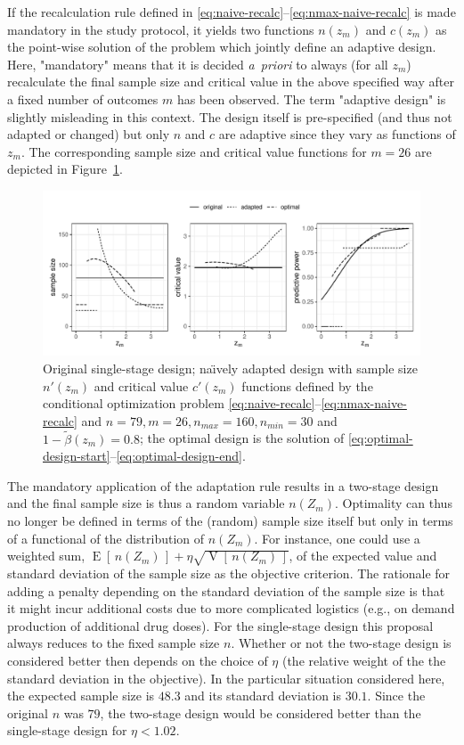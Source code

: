 \documentclass[12pt]{article}
\newcommand{\E}{\ensuremath{\operatorname{E}}}
\newcommand{\V}{\operatorname{V}}
\begin{document}
If the recalculation rule defined in \eqref{eq:naive-recalc}--\eqref{eq:nmax-naive-recalc} is made mandatory in the
study protocol,
it yields two functions $n(z_m)$ and $c(z_m)$ as the point-wise solution of the problem
which jointly define an adaptive design.
Here, "mandatory" means that it is decided \textit{a~priori} to always (for all $z_m$)
recalculate the
final sample size and critical value in the
above specified way after a fixed number of outcomes $m$ has been observed.
The term "adaptive design" is slightly misleading in this context.
The design itself is pre-specified (and thus not adapted or changed)
but only $n$ and $c$ are adaptive since they vary as functions of $z_m$.
The corresponding sample size and critical value functions for $m=26$ are depicted in Figure~\ref{fig:binding-recalculation}.
\begin{figure}
    \centering
    \includegraphics[width=\textwidth]{figures/naive_adaptive_and_optimal_designs}
    \caption{%
        Original single-stage design; na\"{\i}vely adapted design
        with sample size $n'(z_m)$ and critical value $c'(z_m)$ functions defined by the conditional optimization problem \eqref{eq:naive-recalc}--\eqref{eq:nmax-naive-recalc} and
        ${n=79}, {m=26}, {n_{max}=160}, {n_{min}=30}$ and $1-\widetilde{\beta}(z_m)=0.8$;
        the optimal design is the solution of \eqref{eq:optimal-design-start}--\eqref{eq:optimal-design-end}.
    }
    \label{fig:binding-recalculation}
\end{figure}

The mandatory application of the adaptation rule
results in a two-stage design and the final sample size is thus a random variable $n(Z_m)$.
Optimality can thus no longer be defined in terms of the (random) sample size itself but only in terms of a functional of the distribution of $n(Z_m)$.
For instance, one could use a weighted sum, $\E[\,n(Z_m)\,] + \eta \sqrt{\V[\,n(Z_m)\,]}$, of the expected value and standard deviation of the sample size as the objective criterion.
The rationale for adding a penalty depending on the standard deviation of the sample size is that it might incur additional costs due to more
complicated logistics (e.g., on demand production of additional drug doses).
For the single-stage design this proposal always reduces to the fixed sample size $n$.
Whether or not the two-stage design is considered better then depends on the choice of $\eta$ (the relative weight of the the standard deviation in the objective).
In the particular situation considered here, the expected sample size is $48.3$ and its standard deviation is $30.1$.
Since the original $n$ was $79$, the two-stage
design would be considered better
than the single-stage design for $\eta<1.02$.
\end{document}
